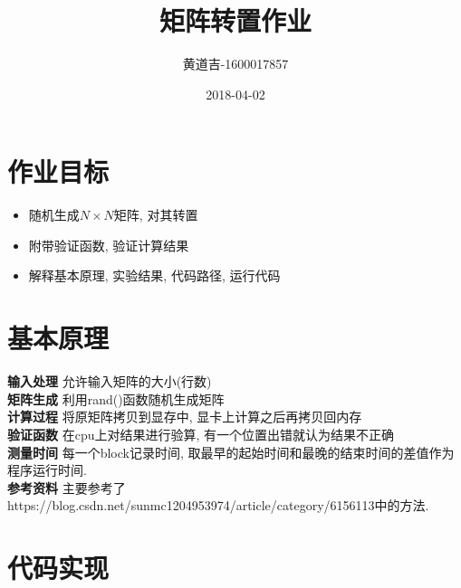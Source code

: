 \documentclass{article}
\title{矩阵转置作业}
\date{2018-04-02}
\author{
  黄道吉-1600017857
}
\begin{document}
\maketitle

\section{作业目标}
  \begin{itemize}
    \item 随机生成$N \times N$矩阵, 对其转置
    \item 附带验证函数, 验证计算结果
    \item 解释基本原理, 实验结果, 代码路径, 运行代码
  \end{itemize}

\section{基本原理}
  \textbf{输入处理} 允许输入矩阵的大小(行数) \\
  \textbf{矩阵生成} 利用rand()函数随机生成矩阵 \\
  \textbf{计算过程} 将原矩阵拷贝到显存中, 显卡上计算之后再拷贝回内存 \\
  \textbf{验证函数} 在cpu上对结果进行验算, 有一个位置出错就认为结果不正确 \\
  \textbf{测量时间} 每一个block记录时间, 取最早的起始时间和最晚的结束时间的差值作为程序运行时间. \\
  \textbf{参考资料} 主要参考了https://blog.csdn.net/sunmc1204953974/article/category/6156113中的方法. \\

\section{代码实现}
\end{document}
